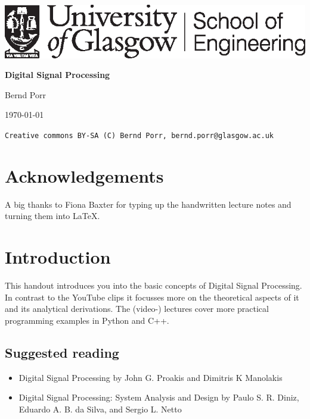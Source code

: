 \documentclass[12pt,a4paper]{article}
\begin{document}
\begin{center}
\mbox{\includegraphics[width=\textwidth]{SchEng_mono}}

\vfill

{\bf \Huge Digital Signal Processing}

\bigskip

{\Large Bernd Porr}

\vfill

{\tiny \today}

\bigskip

\noindent\texttt{Creative commons BY-SA (C) Bernd Porr, bernd.porr@glasgow.ac.uk}




\end{center}

\clearpage

\tableofcontents

\clearpage

\section{Acknowledgements}
A big thanks to Fiona Baxter for typing up the handwritten lecture notes and turning
them into \LaTeX.

\section{Introduction}
This handout introduces you into the basic concepts of Digital Signal Processing.
In contrast to the YouTube clips it focusses more on the theoretical
aspects of it and its analytical derivations. The (video-) lectures
cover more practical programming examples in Python and C++.

\subsection{Suggested reading}
\begin{itemize}
\item Digital Signal Processing
by John G. Proakis and Dimitris K Manolakis
\item Digital Signal Processing: System Analysis and Design by Paulo S. R. Diniz, Eduardo A. B. da Silva, and Sergio L. Netto 
\end{itemize}
\end{document}

